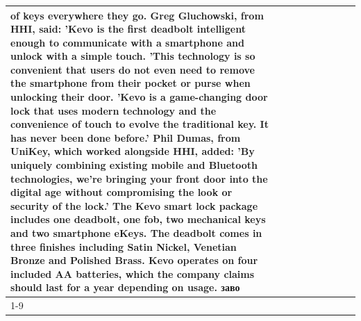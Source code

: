 \begin{table}[H]
\begin{tabular}{lllrlllll}
of keys everywhere they go. Greg Gluchowski, from HHI, said: 'Kevo is the first deadbolt intelligent enough to communicate with a smartphone and unlock with a simple touch. 'This technology is so convenient that users do not even need to remove the smartphone from their pocket or purse when unlocking their door. 'Kevo is a game-changing door lock that uses modern technology and the convenience of touch to evolve the traditional key. It has never been done before.' Phil Dumas, from UniKey, which worked alongside HHI, added: 'By uniquely combining existing mobile and Bluetooth technologies, we’re bringing your front door into the digital age without compromising the look or security of the lock.' The Kevo smart lock package includes one deadbolt, one fob, two mechanical keys and two smartphone eKeys. The deadbolt comes in three finishes including Satin Nickel, Venetian Bronze and Polished Brass. Kevo operates on four included AA batteries, which the company claims should last for a year depending on usage. заво \\
\cline{1-9}

\end{tabular}
\end{table}
